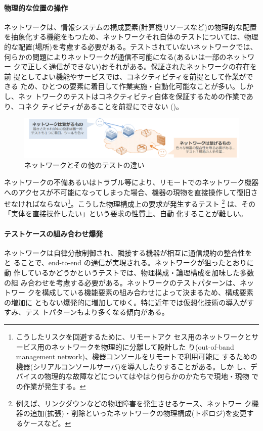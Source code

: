     \paragraph{物理的な位置の操作}
ネットワークは、情報システムの構成要素(計算機リソースなど)の物理的な配置
を抽象化する機能をもつため、ネットワークそれ自体のテストについては、物理
的な配置(場所)を考慮する必要がある。テストされていないネットワークでは、
何らかの問題によりネットワークが通信不可能になる(あるいは一部のネットワー
クで正しく通信ができない)おそれがある。保証されたネットワークの存在を前
提としてよい機能やサービスでは、コネクティビティを前提として作業ができる
ため、ひとつの要素に着目して作業実施・自動化可能なことが多い。しかし、ネッ
トワークのテストはコネクティビティ自体を保証するための作業であり、コネク
ティビティがあることを前提にできない
()。

 \begin{figure}[h]
  \centering
  \includegraphics[scale=0.45]{img/difficulty-of-network-testing.png}
  \caption{ネットワークとその他のテストの違い}
  \label{fig:difficulty-of-network-testing}
 \end{figure}

ネットワークの不備あるいはトラブル等により、リモートでのネットワーク機器
へのアクセスが不可能になってしまった場合、機器の現物を直接操作して復旧さ
せなければならない\footnote{こうしたリスクを回避するために、リモートアク
セス用のネットワークとサービス用のネットワークを物理的に分離して設計した
り(out-of-band management network)、機器コンソールをリモートで利用可能に
するための機器(シリアルコンソールサーバ)を導入したりすることがある。しか
し、デバイスの物理的な故障などについてはやはり何らかのかたちで現地・現物
での作業が発生する。}。こうした物理構成上の要求が発生するテスト
\footnote{例えば、リンクダウンなどの物理障害を発生させるケース、ネットワー
ク機器の追加(拡張)・削除といったネットワークの物理構成(トポロジ)を変更す
るケースなど。} は、その「実体を直接操作したい」という要求の性質上、自動
化することが難しい。

    \paragraph{テストケースの組み合わせ爆発}
ネットワークは自律分散制御され、隣接する機器が相互に通信規約の整合性をと
ることで、end-to-end の通信が実現される。ネットワークが狙ったとおりに動
作しているかどうかというテストでは、物理構成・論理構成を加味した多数の組
み合わせを考慮する必要がある。ネットワークのテストパターンは、ネットワー
クを構成している機能要素の組み合わせによって決まるため、構成要素の増加に
ともない爆発的に増加してゆく。特に近年では仮想化技術の導入がすすみ、テス
トパターンもより多くなる傾向がある。

